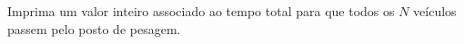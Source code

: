 Imprima um valor inteiro associado ao tempo total para que todos os $N$ veículos passem pelo posto de pesagem.
